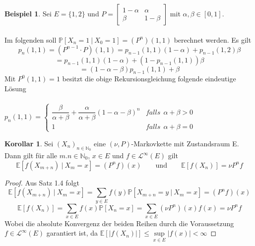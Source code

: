 \documentclass[a4paper,12pt]{scrartcl}
\theoremstyle{definition}
\newtheorem{kol}{Korollar}[section]
\newtheorem{bsp}{Beispiel}[section]
\begin{document}
\begin{bsp}
Sei $E = \lbrace 1,2 \rbrace$ und  $P = \begin{bmatrix} 1 - \alpha & \alpha \\ \beta & 1 - \beta  \end{bmatrix}$ mit $\alpha, \beta \in [0,1].$
\\
\\
Im folgenden soll $\mathbb{P}[X_{n} = 1 \: | \: X_{0} = 1] = (P^{n})(1,1)$ berechnet werden. Es gilt
\begin{equation*}
p_{n}(1,1) = (P^{n-1} \cdot P)(1,1) = p_{n-1}(1,1)(1 - \alpha) + p_{n-1}(1,2)\beta
\end{equation*}
\begin{equation*}
= p_{n-1}(1,1)(1-\alpha) + (1 - p_{n-1}(1,1))\beta
\end{equation*}
\begin{equation*}
= (1-\alpha - \beta)p_{n-1}(1,1) + \beta
\end{equation*}
Mit $P^{0}(1,1) = 1$ besitzt die obige Rekursionsgleichung folgende eindeutige Lösung
\\
\\
$p_{n}(1,1)=
\begin{cases}
\dfrac{\beta}{\alpha + \beta} + \dfrac{\alpha}{\alpha + \beta}(1 - \alpha - \beta)^{n}  &  falls \: \: \alpha + \beta > 0\\
1 & falls \: \: \alpha + \beta = 0
\end{cases}$
\end{bsp}
\begin{kol}
Sei $(X_{n})_{n \in \mathbb{N}_{0}}$  eine $(\nu,P)$-Markovkette mit Zustandsraum E. Dann gilt für alle $m.n \in \mathbb{N}_{0}$, $x \in E$ und $f \in \mathcal{L}^{\infty}(E) $ gilt
\begin{equation*}
\mathbb{E}[f(X_{m+n}) \: | \: X_{m} = x] = (P^{n}f)(x) \qquad \mathrm{und} \qquad \mathbb{E}[f(X_{n})] = \nu P^{n}f
\end{equation*}
\end{kol}
\begin{proof}
Aus Satz 1.4 folgt
\begin{equation*}
\mathbb{E}[f(X_{m+n}) \: | \: X_{m} = x] = \sum_{y \in E} f(y)\mathbb{P}[X_{m+n} = y \: | \: X_{m} = x] = (P^{n}f)(x)
\end{equation*}
\begin{equation*}
\mathbb{E}[f(X_{n})] = \sum_{x \in E} f(x) \mathbb{P}[X_{n} = x] = \sum_{x \in E} (\nu P^{n})(x) f(x) = \nu P^{n}f
\end{equation*}
Wobei die absolute Konvergenz der beiden Reihen durch die Voraussetzung $f \in \mathcal{L}^{\infty}(E) $ garantiert ist, da $\mathbb{E}[|f(X_{n})|] \leq \sup\limits_{x \in E} |f(x)| < \infty$
\end{proof}
\end{document}
